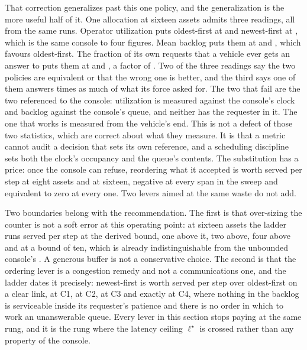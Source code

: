 \documentclass[11pt]{article}
\begin{document}
That correction generalizes past this one policy, and the generalization is the more useful half of
it. One allocation at sixteen assets admits three readings, all from the same runs. Operator
utilization puts oldest-first at \KpClearUtilFifo{} and newest-first at \KpClearUtilLifo{}, which is
the same console to four figures. Mean backlog puts them at \KpClearBackFifo{} and
\KpClearBackLifo{}, which favours oldest-first. The fraction of its own requests that a vehicle ever
gets an answer to puts them at \KpClearAnsFifo{} and \KpClearAnsLifo{}, a factor of
\KpClearAnsRatio{}. Two of the three readings say the two policies are equivalent or that the wrong
one is better, and the third says one of them answers \KpClearAnsRatio{} times as much of what its
force asked for. The two that fail are the two referenced to the console: utilization is measured against the console's clock and
backlog against the console's queue, and neither has the requester in it. The one that works is
measured from the vehicle's end. This is not a defect of those two statistics, which are correct
about what they measure. It is that a metric cannot audit a decision that sets its own reference,
and a scheduling discipline sets both the clock's occupancy and the queue's contents. The
substitution has a
price: once the console can refuse, reordering what it accepted is worth
\LvSubEight{} served per step at eight assets and \LvSubSixteen{} at sixteen, negative at every span
in the sweep and equivalent to zero at every one. Two levers aimed at the same waste do not add.

Two boundaries belong with the recommendation. The first is that over-sizing the counter is not a
soft error at this operating point: at sixteen assets the ladder runs \LvCapTwo{} served per step at
the derived bound, \LvCapThree{} one above it, \LvCapFour{} two above, \LvCapSix{} four above and
\LvCapTen{} at a bound of ten, which is already indistinguishable from the unbounded console's
\LvSrvNone{}. A generous buffer is not a conservative choice. The second is that the ordering lever
is a congestion remedy and not a communications one, and the ladder dates it precisely: newest-first
is worth \LvJamClear{} served per step over oldest-first on a clear link, \LvJamOne{} at C1,
\LvJamTwo{} at C2, \LvJamThree{} at C3 and exactly \LvJamFour{} at C4, where nothing in the backlog
is serviceable inside its requester's patience and there is no order in which to work an unanswerable
queue. Every lever in this section stops paying at the same rung, and it is the rung where the
latency ceiling $\ell^{\star}$ is crossed rather than any property of the console.
\end{document}
